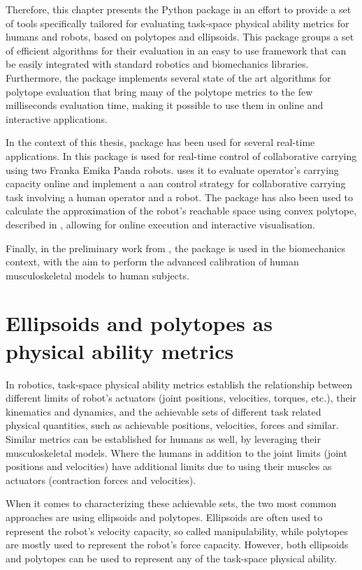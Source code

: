 Therefore, this chapter presents the  Python package in an effort to provide a set of tools specifically tailored for evaluating task-space physical ability metrics for humans and robots, based on polytopes and ellipsoids. This package groups a set of efficient algorithms for their evaluation in an easy to use framework that can be easily integrated with standard robotics and biomechanics libraries. Furthermore, the package implements several state of the art algorithms for polytope evaluation that bring many of the polytope metrics to the few milliseconds evaluation time, making it possible to use them in online and interactive applications. 

In the context of this thesis,  package has been used for several real-time applications. In  this package is used for real-time control of collaborative carrying using two Franka Emika Panda robots.  uses it to evaluate operator's carrying capacity online and implement a \gls{aan} control strategy for collaborative carrying task involving a human operator and a robot. The package has also been used to calculate the approximation of the robot's reachable space using convex polytope, described in , allowing for online execution and interactive visualisation.

Finally, in the preliminary work from  \citet{laisne2023Genetic}, the package is used in the biomechanics context, with the aim to perform the advanced calibration of human musculoskeletal models to human subjects.

\section{Ellipsoids and polytopes as physical ability metrics}
\label{sec:pycapacity_ellip_poly}
In robotics, task-space physical ability metrics establish the relationship between different limits of robot's actuators (joint positions, velocities, torques, etc.), their kinematics and dynamics, and the achievable sets of different task related physical quantities, such as achievable positions, velocities, forces and similar. Similar metrics can be established for humans as well, by leveraging their musculoskeletal models. Where the humans in addition to the joint limits (joint positions and velocities) have additional limits due to using their muscles as actuators (contraction forces and velocities).

When it comes to characterizing these achievable sets, the two most common approaches are using ellipsoids and polytopes. Ellipsoids are often used to represent the robot's velocity capacity, so called manipulability, while polytopes are mostly used to represent the robot's force capacity. However, both ellipsoids and polytopes can be used to represent any of the task-space physical ability.


